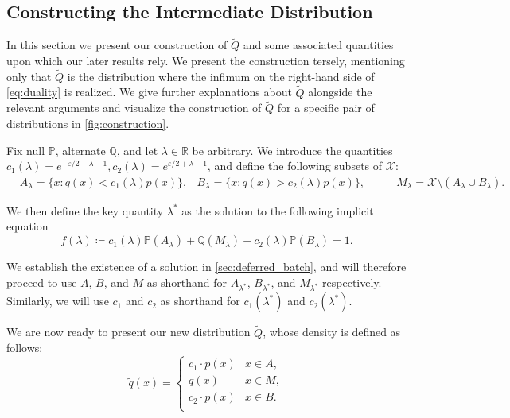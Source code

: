 \documentclass{article}
\newcommand{\Null}{\mathbb{P}}
\newcommand{\Alt}{\mathbb{Q}}
\newcommand{\eps}{\varepsilon}
\begin{document}
\subsection{Constructing the Intermediate Distribution}
\label{sec:batch_construction}

In this section we present our construction of $\widetilde Q$ and some associated quantities upon which our later results rely.
We present the construction tersely, mentioning only that $\widetilde Q$ is the distribution where the infimum on the right-hand side of \eqref{eq:duality} is realized.
We give further explanations about $\widetilde Q$ alongside the relevant arguments and visualize the construction of $\widetilde Q$ for a specific pair of distributions in \cref{fig:construction}.

Fix null $\Null$, alternate $\Alt$, and let $\lambda \in \mathbb{R}$ be arbitrary. We introduce the quantities $c_1(\lambda) = e^{-\eps/2 + \lambda - 1}, c_2(\lambda) = e^{\eps/2 + \lambda - 1}$, and define the following subsets of $\mathcal{X} $: 
\begin{align*}
    &A_\lambda = \lbrace x: q(x) < c_1(\lambda) p(x) \rbrace,
    &B_\lambda = \lbrace x : q(x) > c_2(\lambda) p(x) \rbrace, \qquad
    &M_\lambda = \mathcal{X} \setminus (A_\lambda \cup B_\lambda).
\end{align*}

We then define the key quantity $\lambda^*$ as the solution to the following implicit equation
\begin{equation}\label{eq:lambda-star}
    f(\lambda) \coloneq c_1(\lambda) \Null(A_\lambda) + \Alt(M_\lambda) + c_2(\lambda) \Null(B_\lambda) = 1.
\end{equation}

We establish the existence of a solution in \cref{sec:deferred_batch}, and will therefore 
proceed to use $A$, $B$, and $M$ as shorthand for $A_{\lambda^*}$, $B_{\lambda^*}$, and $M_{\lambda^*}$ respectively. Similarly, we will use $c_1$ and $c_2$ as shorthand for $c_1(\lambda^*)$ and $c_2(\lambda^*)$.

We are now ready to present our new distribution $\widetilde Q$, whose density is defined as follows:
\begin{equation}
    \widetilde q(x) =
    \begin{cases}
        c_1\cdot  p(x) & x \in A, \\
        q(x) & x \in M, \\
        c_2 \cdot  p(x) & x \in B. \\
    \end{cases}
\end{equation}
\end{document}
